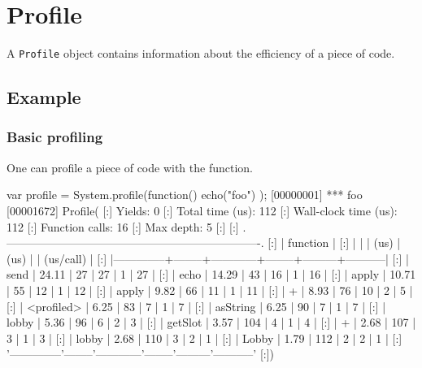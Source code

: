 
\section{Profile}

A \lstinline|Profile| object contains information about the efficiency of a
piece of code.

\subsection{Example}

\subsubsection{Basic profiling}

One can profile a piece of code with the  function.

\begin{urbiscript}
var profile = System.profile(function() { echo("foo") });
[00000001] *** foo
[00001672] Profile(
[:]  Yields:                    0
[:]  Total time (us):         112
[:]  Wall-clock time (us):    112
[:]  Function calls:           16
[:]  Max depth:                 5
[:]
[:]  .-------------------------------------------------------------------.
[:]  |   function   |   %
[:]  |              |        |    (us)    |  (us)  |         | (us/call) |
[:]  |--------------+--------+------------+--------+---------+-----------|
[:]  |         send |  24.11 |         27 |     27 |       1 |        27 |
[:]  |         echo |  14.29 |         43 |     16 |       1 |        16 |
[:]  |        apply |  10.71 |         55 |     12 |       1 |        12 |
[:]  |        apply |   9.82 |         66 |     11 |       1 |        11 |
[:]  |            + |   8.93 |         76 |     10 |       2 |         5 |
[:]  |   <profiled> |   6.25 |         83 |      7 |       1 |         7 |
[:]  |     asString |   6.25 |         90 |      7 |       1 |         7 |
[:]  |        lobby |   5.36 |         96 |      6 |       2 |         3 |
[:]  |      getSlot |   3.57 |        104 |      4 |       1 |         4 |
[:]  |            + |   2.68 |        107 |      3 |       1 |         3 |
[:]  |        lobby |   2.68 |        110 |      3 |       2 |         1 |
[:]  |        Lobby |   1.79 |        112 |      2 |       2 |         1 |
[:]  '--------------'--------'------------'--------'---------'-----------'
[:])
\end{urbiscript}

